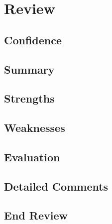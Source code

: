 \section{Review}

\subsection{Confidence}

\subsection{Summary}

\subsection{Strengths}

\subsection{Weaknesses}

\subsection{Evaluation}

\subsection{Detailed Comments}

\subsection*{End Review}
